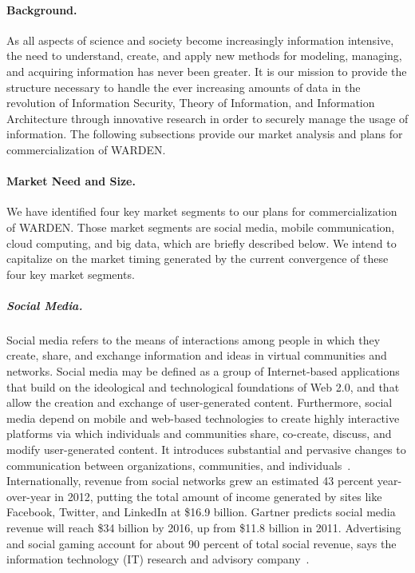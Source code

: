 \documentclass{sbir}
\begin{document}
\label{commercialization}

\paragraph{Background.} As all aspects of science and society become increasingly information intensive, the need to understand, create, and apply new methods for modeling, managing, and acquiring information has never been greater. It is our mission to provide the structure necessary to handle the ever increasing amounts of data in the revolution of Information Security, Theory of Information, and Information Architecture through innovative research in order to securely manage the usage of information. The following subsections provide our market analysis and plans for commercialization of WARDEN.

\paragraph{Market Need and Size.} We have identified four key market segments to our plans for commercialization of WARDEN. Those market segments are social media, mobile communication, cloud computing, and big data, which are briefly described below. We intend to capitalize on the market timing generated by the current convergence of these four key market segments.

\vspace{-12pt}
\subparagraph{Social Media.} Social media refers to the means of interactions among people in which they create, share, and exchange information and ideas in virtual communities and networks. Social media may be defined as a group of Internet-based applications that build on the ideological and technological foundations of Web 2.0, and that allow the creation and exchange of user-generated content. Furthermore, social media depend on mobile and web-based technologies to create highly interactive platforms via which individuals and communities share, co-create, discuss, and modify user-generated content. It introduces substantial and pervasive changes to communication between organizations, communities, and individuals~\cite{WikipediaSocial:13}.
Internationally, revenue from social networks grew an estimated 43 percent year-over-year in 2012, putting the total amount of income generated by sites like Facebook, Twitter, and LinkedIn at \$16.9 billion. Gartner predicts social media revenue will reach \$34 billion by 2016, up from \$11.8 billion in 2011. Advertising and social gaming account for about 90 percent of total social revenue, says the information technology (IT) research and advisory company~\cite{Mi:12}.
\end{document}
